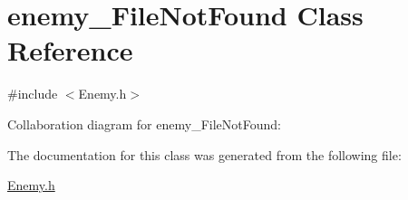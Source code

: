 \hypertarget{classenemy___file_not_found}{}\section{enemy\+\_\+\+File\+Not\+Found Class Reference}
\label{classenemy___file_not_found}


{\ttfamily \#include $<$Enemy.\+h$>$}



Collaboration diagram for enemy\+\_\+\+File\+Not\+Found\+:


The documentation for this class was generated from the following file\+:\begin{DoxyCompactItemize}
\item 
\hyperlink{_enemy_8h}{Enemy.\+h}\end{DoxyCompactItemize}
